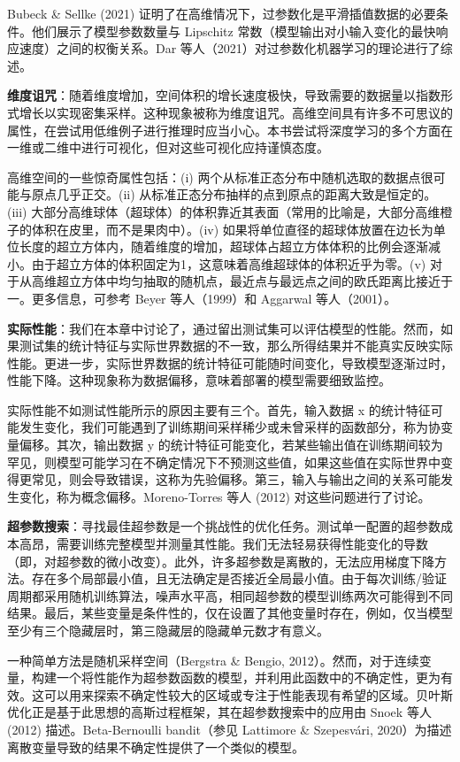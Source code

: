 \documentclass[lang=cn,newtx,10pt,scheme=chinese]{elegantbook}
\begin{document}
Bubeck \& Sellke (2021) 证明了在高维情况下，过参数化是平滑插值数据的必要条件。他们展示了模型参数数量与 Lipschitz 常数（模型输出对小输入变化的最快响应速度）之间的权衡关系。Dar 等人（2021）对过参数化机器学习的理论进行了综述。

\textbf{维度诅咒}：随着维度增加，空间体积的增长速度极快，导致需要的数据量以指数形式增长以实现密集采样。这种现象被称为维度诅咒。高维空间具有许多不可思议的属性，在尝试用低维例子进行推理时应当小心。本书尝试将深度学习的多个方面在一维或二维中进行可视化，但对这些可视化应持谨慎态度。

高维空间的一些惊奇属性包括：(i) 两个从标准正态分布中随机选取的数据点很可能与原点几乎正交。(ii) 从标准正态分布抽样的点到原点的距离大致是恒定的。(iii) 大部分高维球体（超球体）的体积靠近其表面（常用的比喻是，大部分高维橙子的体积在皮里，而不是果肉中）。(iv) 如果将单位直径的超球体放置在边长为单位长度的超立方体内，随着维度的增加，超球体占超立方体体积的比例会逐渐减小。由于超立方体的体积固定为1，这意味着高维超球体的体积近乎为零。(v) 对于从高维超立方体中均匀抽取的随机点，最近点与最远点之间的欧氏距离比接近于一。更多信息，可参考 Beyer 等人（1999）和 Aggarwal 等人（2001）。

\textbf{实际性能}：我们在本章中讨论了，通过留出测试集可以评估模型的性能。然而，如果测试集的统计特征与实际世界数据的不一致，那么所得结果并不能真实反映实际性能。更进一步，实际世界数据的统计特征可能随时间变化，导致模型逐渐过时，性能下降。这种现象称为数据偏移，意味着部署的模型需要细致监控。

实际性能不如测试性能所示的原因主要有三个。首先，输入数据 x 的统计特征可能发生变化，我们可能遇到了训练期间采样稀少或未曾采样的函数部分，称为协变量偏移。其次，输出数据 y 的统计特征可能变化，若某些输出值在训练期间较为罕见，则模型可能学习在不确定情况下不预测这些值，如果这些值在实际世界中变得更常见，则会导致错误，这称为先验偏移。第三，输入与输出之间的关系可能发生变化，称为概念偏移。Moreno-Torres 等人 (2012) 对这些问题进行了讨论。

\textbf{超参数搜索}：寻找最佳超参数是一个挑战性的优化任务。测试单一配置的超参数成本高昂，需要训练完整模型并测量其性能。我们无法轻易获得性能变化的导数（即，对超参数的微小改变）。此外，许多超参数是离散的，无法应用梯度下降方法。存在多个局部最小值，且无法确定是否接近全局最小值。由于每次训练/验证周期都采用随机训练算法，噪声水平高，相同超参数的模型训练两次可能得到不同结果。最后，某些变量是条件性的，仅在设置了其他变量时存在，例如，仅当模型至少有三个隐藏层时，第三隐藏层的隐藏单元数才有意义。

一种简单方法是随机采样空间（Bergstra \& Bengio, 2012）。然而，对于连续变量，构建一个将性能作为超参数函数的模型，并利用此函数中的不确定性，更为有效。这可以用来探索不确定性较大的区域或专注于性能表现有希望的区域。贝叶斯优化正是基于此思想的高斯过程框架，其在超参数搜索中的应用由 Snoek 等人 (2012) 描述。Beta-Bernoulli bandit（参见 Lattimore \& Szepesvári, 2020）为描述离散变量导致的结果不确定性提供了一个类似的模型。
\end{document}
